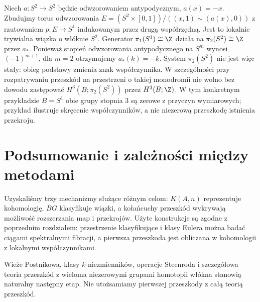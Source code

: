 \begin{przyklad}
Niech $a:S^2\to S^2$ będzie odwzorowaniem antypodycznym,
$a(x)=-x$. Zbudujmy torus odwzorowania
$E=(S^2\times[0,1])/((x,1)\sim(a(x),0))$
z rzutowaniem $p:E\to S^1$ indukowanym przez drugą
współrzędną. Jest to lokalnie trywialna wiązka o włóknie
$S^2$. Generator $\pi_1(S^1)\cong\Z$ działa na
$\pi_2(S^2)\cong\Z$ przez $a_*$. Ponieważ stopień
odwzorowania antypodycznego na $S^m$ wynosi
$(-1)^{m+1}$, dla $m=2$ otrzymujemy
$a_*(k)=-k$. System $\mathcal\pi_2(S^2)$ nie jest
więc stały: obieg podstawy zmienia znak współczynnika.
W szczególności przy rozpatrywaniu przeszkód na
przestrzeni o takiej monodromii nie wolno bez dowodu
zastępować $H^3(B;\mathcal\pi_2(S^2))$ przez
$H^3(B;\Z)$. W tym konkretnym przykładzie $B=S^1$
obie grupy stopnia $3$ są zerowe z przyczyn
wymiarowych; przykład ilustruje skręcenie współczynników,
a nie niezerową przeszkodę istnienia przekroju.
\end{przyklad}

\section{Podsumowanie i zależności między metodami}
Uzyskaliśmy trzy mechanizmy służące różnym celom:
$K(A,n)$ reprezentuje kohomologię,
$BG$ klasyfikuje wiązki, a kołańcuchy przeszkód
wykrywają możliwość rozszerzania map i przekrojów.
Użyte konstrukcje są zgodne z poprzednim rozdziałem:
przestrzenie klasyfikujące i klasy Eulera można badać
ciągami spektralnymi fibracji, a pierwsza przeszkoda
jest obliczana w kohomologii z lokalnymi współczynnikami.

Wieże Postnikowa, klasy $k$-niezmienników,
operacje Steenroda i szczegółowa teoria przeszkód
z wieloma niezerowymi grupami homotopii włókna
stanowią naturalny następny etap. Nie utożsamiamy
pierwszej przeszkody z całą teorią przeszkód.

